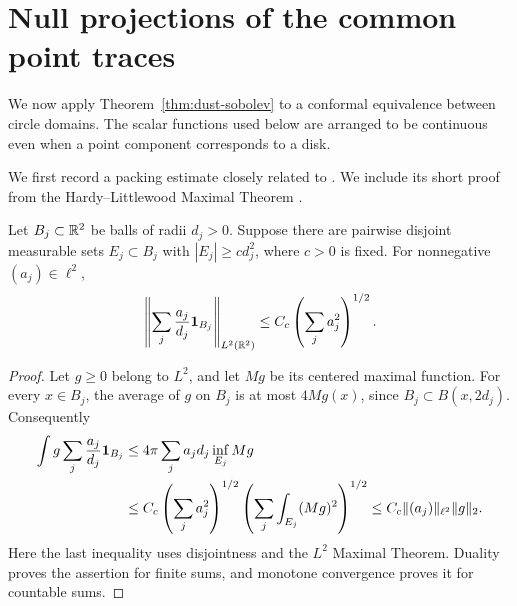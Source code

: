 \section{Null projections of the common point traces}
\label{sec:traces}

We now apply Theorem~\ref{thm:dust-sobolev} to a conformal equivalence
between circle domains.  The scalar functions used below are arranged to
be continuous even when a point component corresponds to a disk.

We first record a packing estimate closely related to
\cite[Lemma~2.1]{Ntalampekos2023}.  We include its short proof from the
Hardy--Littlewood Maximal Theorem \cite{Stein1970}.
\begin{lemma}\label{lem:ball-synthesis}
Let $B_j\subset\mathbb R^2$ be balls of radii $d_j>0$.  Suppose there are
pairwise disjoint measurable sets $E_j\subset B_j$ with
$|E_j|\geq c d_j^2$, where $c>0$ is fixed.  For nonnegative
$(a_j)\in\ell^2$,
\[
 \left\|\sum_j\frac{a_j}{d_j}{\bf1}_{B_j}\right\|_{L^2(\mathbb R^2)}
 \leq C_c\left(\sum_j a_j^2\right)^{1/2}.
\]
\end{lemma}
\begin{proof}
Let $g\geq0$ belong to $L^2$, and let $Mg$ be its centered maximal
function.  For every $x\in B_j$, the average of $g$ on $B_j$ is at
most $4Mg(x)$, since $B_j\subset B(x,2d_j)$.  Consequently
\begin{align*}
 \int g\sum_j\frac{a_j}{d_j}{\bf1}_{B_j}
 &\leq 4\pi\sum_j a_jd_j\inf_{E_j}Mg\\
 &\leq C_c\left(\sum_j a_j^2\right)^{1/2}
       \left(\sum_j\int_{E_j}(Mg)^2\right)^{1/2}
 \leq C_c\|(a_j)\|_{\ell^2}\|g\|_2.
\end{align*}
Here the last inequality uses disjointness and the $L^2$ Maximal
Theorem.  Duality proves the assertion for finite sums, and monotone
convergence proves it for countable sums.
\end{proof}

